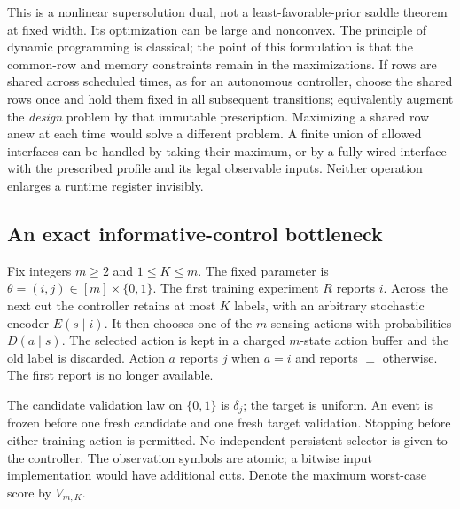 This is a nonlinear supersolution dual, not a least-favorable-prior
saddle theorem at fixed width. Its optimization can be large and
nonconvex. The principle of dynamic programming is classical; the point
of this formulation is that the common-row and memory constraints
remain in the maximizations. If rows are shared across scheduled times,
as for an autonomous controller, choose the shared rows once and hold
them fixed in all subsequent transitions; equivalently augment the
\emph{design} problem by that immutable prescription. Maximizing a
shared row anew at each time would solve a different problem.
A finite union of allowed interfaces can be handled by taking their
maximum, or by a fully wired interface with the prescribed profile and
its legal observable inputs. Neither operation enlarges a runtime
register invisibly.

\subsection{An exact informative-control bottleneck}
Fix integers $m\ge2$ and $1\le K\le m$. The fixed parameter is
$\theta=(i,j)\in[m]\times\{0,1\}$. The first training experiment $R$
reports $i$. Across the next cut the controller retains at most $K$
labels, with an arbitrary stochastic encoder $E(s\mid i)$. It then
chooses one of the $m$ sensing actions with probabilities $D(a\mid s)$.
The selected action is kept in a charged $m$-state action buffer and the
old label is discarded. Action $a$ reports $j$ when $a=i$ and reports
$\perp$ otherwise. The first report is no longer available.

The candidate validation law on $\{0,1\}$ is $\delta_j$; the target is
uniform. An event is frozen before one fresh candidate and one fresh
target validation. Stopping before either training action is permitted.
No independent persistent selector is given to the controller. The
observation symbols are atomic; a bitwise input implementation would
have additional cuts. Denote the maximum worst-case score by $V_{m,K}$.

